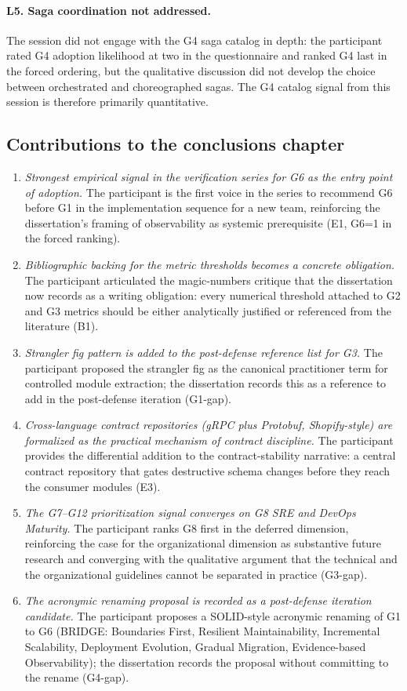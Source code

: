 \paragraph*{L5. Saga coordination not addressed.} The session did not engage with the G4 saga catalog in depth: the participant rated G4 adoption likelihood at two in the questionnaire and ranked G4 last in the forced ordering, but the qualitative discussion did not develop the choice between orchestrated and choreographed sagas. The G4 catalog signal from this session is therefore primarily quantitative.

\subsection*{Contributions to the conclusions chapter}

\begin{enumerate}[itemsep=4pt,topsep=2pt]
  \item \emph{Strongest empirical signal in the verification series for G6 as the entry point of adoption.} The participant is the first voice in the series to recommend G6 before G1 in the implementation sequence for a new team, reinforcing the dissertation's framing of observability as systemic prerequisite (E1, G6=1 in the forced ranking).
  \item \emph{Bibliographic backing for the metric thresholds becomes a concrete obligation.} The participant articulated the magic-numbers critique that the dissertation now records as a writing obligation: every numerical threshold attached to G2 and G3 metrics should be either analytically justified or referenced from the literature (B1).
  \item \emph{Strangler fig pattern is added to the post-defense reference list for G3.} The participant proposed the strangler fig as the canonical practitioner term for controlled module extraction; the dissertation records this as a reference to add in the post-defense iteration (G1-gap).
  \item \emph{Cross-language contract repositories (gRPC plus Protobuf, Shopify-style) are formalized as the practical mechanism of contract discipline.} The participant provides the differential addition to the contract-stability narrative: a central contract repository that gates destructive schema changes before they reach the consumer modules (E3).
  \item \emph{The G7--G12 prioritization signal converges on G8 SRE and DevOps Maturity.} The participant ranks G8 first in the deferred dimension, reinforcing the case for the organizational dimension as substantive future research and converging with the qualitative argument that the technical and the organizational guidelines cannot be separated in practice (G3-gap).
  \item \emph{The acronymic renaming proposal is recorded as a post-defense iteration candidate.} The participant proposes a SOLID-style acronymic renaming of G1 to G6 (BRIDGE: Boundaries First, Resilient Maintainability, Incremental Scalability, Deployment Evolution, Gradual Migration, Evidence-based Observability); the dissertation records the proposal without committing to the rename (G4-gap).
\end{enumerate}

